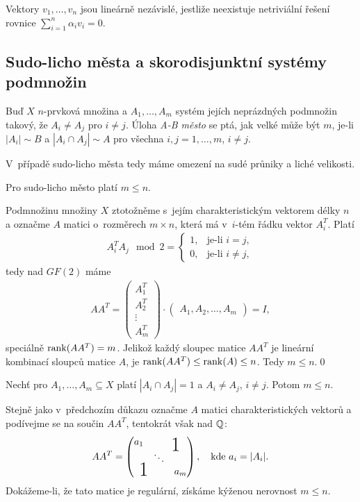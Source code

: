 \df Vektory $v_1,\dots,v_n$ jsou lineárně nezávislé, jestliže neexistuje netriviální řešení 
rovnice $\sum_{i=1}^n \alpha_iv_i=0$.

\medskip
\subsection{Sudo-licho města a skorodisjunktní systémy podmnožin}


\df Buď $X$ $n$-prvková množina a $A_1,\dots,A_m$ systém jejích neprázdných podmnožin takový, že $A_i \ne A_j$ pro $i\neq j$. Úloha {\it A-B město} se ptá, jak velké může být $m$, je-li $|A_i|\sim B$ a $|A_i\cap A_j|\sim A$ pro všechna $i,j=1,\dots,m$, $i\neq j$.

\medskip
V~případě sudo-licho města tedy máme omezení na sudé průniky a liché velikosti.

\vt Pro sudo-licho město platí $m \leq n$.

\dk Podmnožinu množiny $X$ ztotožněme s~jejím charakteristickým vektorem délky $n$ a označme $A$ matici o~rozměrech $m\times n$, která má v~$i$-tém řádku vektor $A_i^T$. Platí
\begin{align}
A_i^TA_j\!\mod2=\begin{cases}1,&\text{je-li }i=j,\\0,&\text{je-li }i\neq j,\end{cases}
\end{align}
tedy nad $GF(2)$ máme
\begin{align}
	AA^T = \left(\begin{matrix}A_1^T\\ A_2^T \\ \vdots \\ A_m^T \end{matrix}\right) 
	\cdot \left(\begin{matrix}A_1, A_2, \dots, A_m\end{matrix}\right) = I,
\end{align}
speciálně $\operatorname{rank}(AA^T) = m$. Jelikož každý sloupec matice $AA^T$ je lineární kombinací sloupců matice $A$, je $\operatorname{rank}(AA^T)\leq\operatorname{rank}(A)\leq n$. Tedy $m\leq n$.\qed

\vt Nechť pro $A_1,\dots,A_m\subseteq X$ platí $|A_i \cap A_j| = 1 $ a $A_i \neq A_j$, $i\neq j$. Potom $m \leq n$.

\dk Stejně jako v~předchozím důkazu označme $A$ matici charakteristických vektorů a podívejme se na součin $AA^T$, tentokrát však nad $\mathbb{Q}$:
\begin{align}
	AA^T = \left(\begin{matrix}
	a_1&&\smash{\bigone\quad}\\
	&\ddots&\\
	\smash{\quad\raisebox{5pt}{\bigone}}&&a_m
	\end{matrix}\right),\quad\text{kde }a_i=|A_i|. 
\end{align}
Dokážeme-li, že tato matice je regulární, získáme kýženou nerovnost $m\leq n$.

